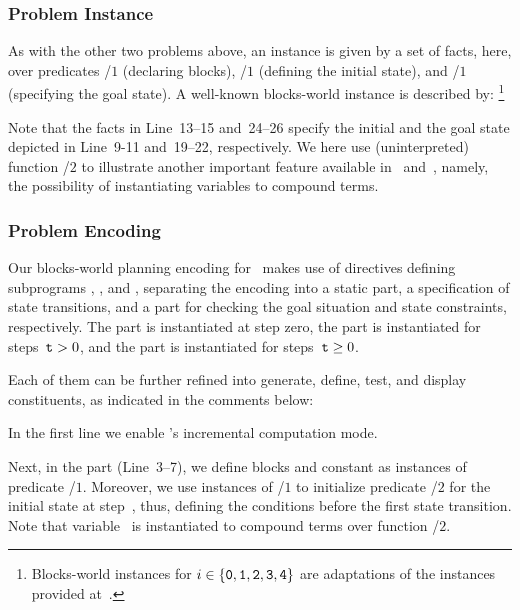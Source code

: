 \subsubsection{Problem Instance}\label{subsec:block:instance}

As with the other two problems above,
an instance is given by a set of facts, here,
over predicates /$1$ (declaring blocks),
/$1$ (defining the initial state), and
/$1$ (specifying the goal state).
A well-known blocks-world instance is described by:%
\footnote{%
  Blocks-world instances  for $i\in\{\texttt{0},\texttt{1},\texttt{2},\texttt{3},\texttt{4}\}$
  are adaptations of the instances provided at~\cite{erdemBW}.}
%

%
Note that the facts in Line~13--15 and~24--26 specify the initial
and the goal state depicted in Line~9-11 and~19--22, respectively.
We here use (uninterpreted) function /$2$ to illustrate another
important feature available in \gringo\ and~\clingo, namely,
the possibility of instantiating variables to compound terms.


\subsubsection{Problem Encoding}\label{subsec:block:encoding}

Our blocks-world planning encoding for \clingo\ makes use of  directives
defining subprograms , , and ,
separating the encoding into 
a static part, 
a specification of state transitions, 
and a part for checking the goal situation and state constraints, respectively.
The  part is instantiated at step zero,
the  part is instantiated for steps~$\texttt{t}>0$,
and the  part is instantiated for steps~$\texttt{t}\geq0$.

Each of them can be further refined into generate, define, test, and display constituents, 
as indicated in the comments below:
%

%
In the first line we enable \clingo's incremental computation mode.

Next, in the  part (Line~3--7),
we define blocks and constant 
as instances of predicate /$1$.
Moreover, we use instances of /$1$
to initialize predicate /$2$ for the initial state at step~, thus,
defining the conditions before the first state transition.
Note that variable~ is instantiated to compound terms
over function /$2$.

